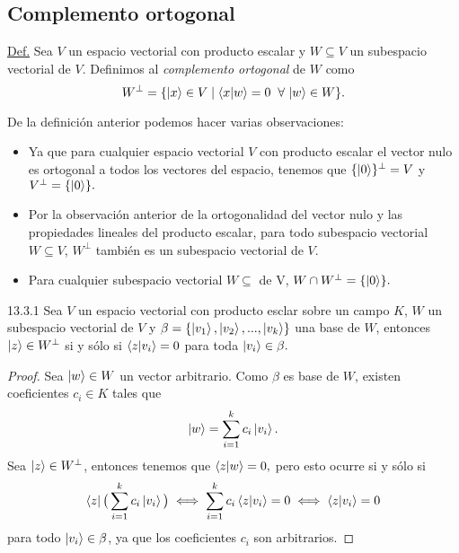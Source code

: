 \documentclass[12pt,libertine]{book}
\begin{document}
\newpage
\subsection*{Complemento ortogonal} \label{Subsec:Complemento_ortogonal} 

\begin{tcolorbox}
    \underline{Def.} Sea $V$ un espacio vectorial con producto escalar y $W\subseteq V$ un subespacio vectorial de $V$. Definimos al \emph{complemento ortogonal} de $W$ como \[
        W^{\perp}=\{\ket{x}\in V\mid \braket{x|w}=0\hspace{2mm}\forall\hspace{0.5mm} \ket{w}\in W\} 
    .\] 
\end{tcolorbox}

\noindent De la definición anterior podemos hacer varias observaciones:
\begin{itemize}
    \item Ya que para cualquier espacio vectorial $V$ con producto escalar el vector nulo es ortogonal a todos los vectores del espacio, tenemos que $\{\ket{0}\}^{\perp}=V$ y $V^{\perp}=\{\ket{0}\}.$
    \item Por la observación anterior de la ortogonalidad del vector nulo y las propiedades lineales del producto escalar, para todo subespacio vectorial $W\subseteq V$, $W^{\perp}$ también es un subespacio vectorial de $V$.
    \item Para cualquier subespacio vectorial $W\subseteq$ de V, $W\cap W^{\perp}=\{\ket{0}\}.$
\end{itemize}

\begin{Lema} {13.3.1}
    Sea $V$ un espacio vectorial con producto esclar sobre un campo $K$, $W$ un subespacio vectorial de $V$ y $\beta=\{\ket{v_1}, \ket{v_2},..., \ket{v_k}\}$ una base de $W$, entonces $\ket{z}\in W^{\perp}$ si y sólo si $\braket{z|v_i}=0$ para toda $\ket{v_i}\in\beta.$

    \begin{proof}
        Sea $\ket{w}\in W$ un vector arbitrario. Como $\beta$ es base de $W$, existen coeficientes $c_i\in K$ tales que \[
            \ket{w}=\sum_{i=1}^k c_i\ket{v_i}
        .\] \noindent Sea $\ket{z}\in W^{\perp}$, entonces tenemos que $\braket{z|w}=0,$ pero esto ocurre si y sólo si \[
        \bra{z}\big(\sum_{i=1}^k c_i\ket{v_i}\big)\iff \sum_{i=1}^k c_i \braket{z|v_i}=0\iff \braket{z|v_i}=0
    \] \noindent para todo $\ket{v_i}\in\beta$, ya que los coeficientes $c_i$ son arbitrarios. 
    \end{proof}

\end{Lema}
\end{document}
